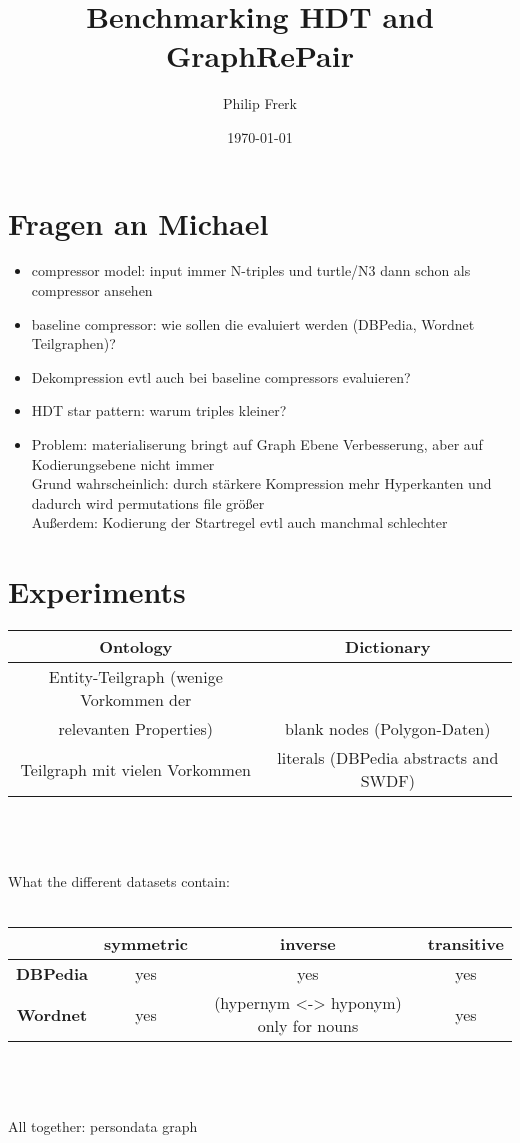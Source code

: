 \documentclass[a4paper]{scrartcl}
\title{Benchmarking HDT and GraphRePair}
\author{Philip Frerk}
\date{\today}
\begin{document}
\maketitle


\section{Fragen an Michael}

\begin{itemize}
	\item compressor model: input immer N-triples und turtle/N3 dann schon als compressor ansehen
	\item baseline compressor: wie sollen die evaluiert werden (DBPedia, Wordnet Teilgraphen)?
	\item Dekompression evtl auch bei baseline compressors evaluieren?
	\item HDT star pattern: warum triples kleiner?
	\item Problem: materialiserung bringt auf Graph Ebene Verbesserung, aber auf Kodierungsebene nicht immer\\
			Grund wahrscheinlich: durch stärkere Kompression mehr Hyperkanten und dadurch wird permutations file größer\\
			Außerdem: Kodierung der Startregel evtl auch manchmal schlechter
\end{itemize}

\section{Experiments}

\begin{tabular}{|c|c|}
	\hline 
	\textbf{Ontology} & \textbf{Dictionary} \\ 
	\hline 
	Entity-Teilgraph (wenige Vorkommen der \\relevanten Properties) & blank nodes (Polygon-Daten) \\ 
	\hline 
	Teilgraph mit vielen Vorkommen & literals (DBPedia abstracts and SWDF) \\ 
	\hline 
\end{tabular} 
\\\\\\What the different datasets contain:\\\\
\begin{tabular}{|c|c|c|c|}
	\hline 
	& \textbf{symmetric} & \textbf{inverse} & \textbf{transitive} \\ 
	\hline 
	\textbf{DBPedia} & yes & yes & yes \\ 
	\hline 
	\textbf{Wordnet} & yes & (hypernym <-> hyponym) only for nouns & yes \\ 
	\hline 
\end{tabular} 
\\\\\\All together: persondata graph
\end{document}
